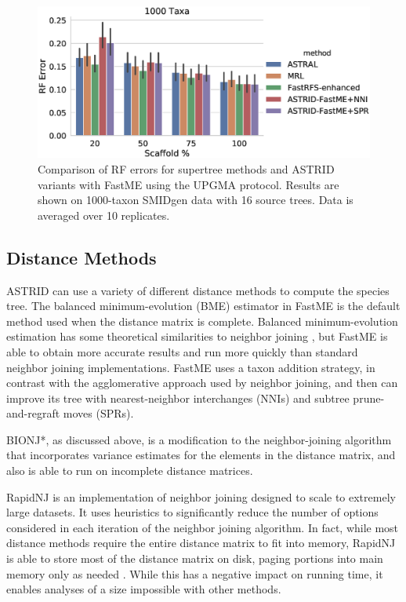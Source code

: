 \begin{figure}[!htb]
    \centering
    \includegraphics[width=\textwidth]{astrid-missing-figs/astral-errs.eps}
    \caption[RF errors for supertree methods and ASTRID variants with FastME using the UPGMA protocol]{Comparison of RF errors for supertree methods and ASTRID variants with FastME using the UPGMA protocol. Results are shown on 1000-taxon SMIDgen data with 16 source trees. Data is averaged over 10 replicates.}
    \label{astrid-missing::fig:astral-errs}
\end{figure}

\subsection{Distance Methods}

ASTRID can use a variety of different distance methods to compute the species tree. The balanced minimum-evolution (BME) estimator in FastME is the default method used when the distance matrix is complete. Balanced minimum-evolution estimation has some theoretical similarities to neighbor joining \cite{gascuel2006neighbor}, but FastME is able to obtain more accurate results and run more quickly than standard neighbor joining implementations. FastME uses a taxon addition strategy, in contrast with the agglomerative approach used by neighbor joining, and then can improve its tree with nearest-neighbor interchanges (NNIs) and subtree prune-and-regraft moves (SPRs). 

BIONJ*, as discussed above, is a modification to the neighbor-joining algorithm that incorporates variance estimates for the elements in the distance matrix, and also is able to run on incomplete distance matrices.

RapidNJ \cite{simonsen2008rapid} is an implementation of neighbor joining designed to scale to extremely large datasets. It uses heuristics to significantly reduce the number of options considered in each iteration of the neighbor joining algorithm. In fact, while most distance methods require the entire distance matrix to fit into memory, RapidNJ is able to store most of the distance matrix on disk, paging portions into main memory only as needed \cite{simonsen2010inference}. While this has a negative impact on running time, it enables analyses of a size impossible with other methods.



